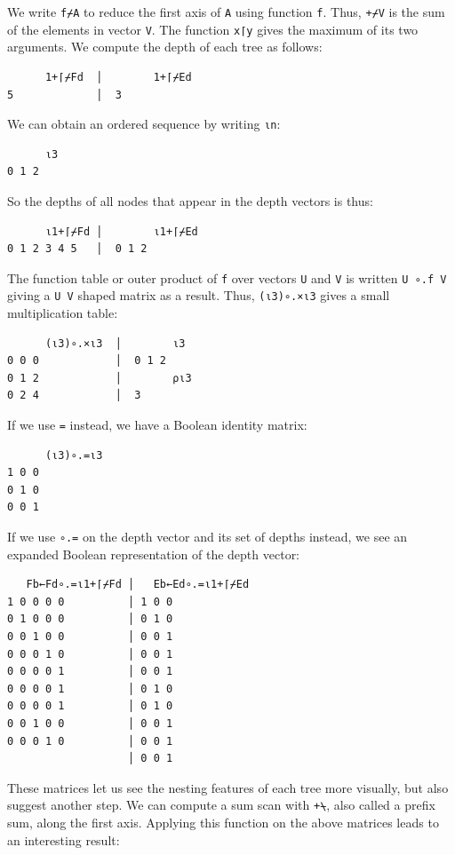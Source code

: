 ﻿\documentclass[numbers,10pt,preprint]{sigplanconf}
\begin{document}
We write \verb;f⌿A; to reduce the first axis of \verb;A; using function \verb;f;. Thus, \verb;+⌿V; is the sum of the elements in vector \verb;V;. The function \verb;x⌈y; gives the maximum of its two arguments. We compute the depth of each tree as follows:

\begin{verbatim}
      1+⌈⌿Fd  │        1+⌈⌿Ed
5             │  3
\end{verbatim}

\noindent We can obtain an ordered sequence  by writing \verb;⍳n;:

\begin{verbatim}
      ⍳3
0 1 2
\end{verbatim}

\noindent
So the depths of all nodes that appear in the depth vectors is thus:

\begin{verbatim}
      ⍳1+⌈⌿Fd │        ⍳1+⌈⌿Ed
0 1 2 3 4 5   │  0 1 2
\end{verbatim}

\noindent The function table or outer product of \verb;f; over vectors \verb;U; and \verb;V; is written \verb;U ∘.f V; giving a \verb;U V; shaped matrix as a result. Thus, \verb;(⍳3)∘.×⍳3; gives a small multiplication table:

\begin{verbatim}
      (⍳3)∘.×⍳3  │        ⍳3
0 0 0            │  0 1 2
0 1 2            │        ⍴⍳3
0 2 4            │  3
\end{verbatim}

\noindent If we use \verb;=; instead, we have a Boolean identity matrix:

\begin{verbatim}
      (⍳3)∘.=⍳3
1 0 0
0 1 0
0 0 1
\end{verbatim}

\noindent If we use \verb;∘.=; on the depth vector and its set of depths instead, we see an expanded Boolean representation of the depth vector:

\begin{verbatim}
   Fb←Fd∘.=⍳1+⌈⌿Fd │   Eb←Ed∘.=⍳1+⌈⌿Ed
1 0 0 0 0          │ 1 0 0
0 1 0 0 0          │ 0 1 0
0 0 1 0 0          │ 0 0 1
0 0 0 1 0          │ 0 0 1
0 0 0 0 1          │ 0 0 1
0 0 0 0 1          │ 0 1 0
0 0 0 0 1          │ 0 1 0
0 0 1 0 0          │ 0 0 1
0 0 0 1 0          │ 0 0 1
                   │ 0 0 1
\end{verbatim}

\noindent These matrices let us see the nesting features of each tree more visually, but also suggest another step. We can compute a sum scan with \verb;+⍀;, also called a prefix sum, along the first axis. Applying this function on the above matrices leads to an interesting result:
\end{document}
